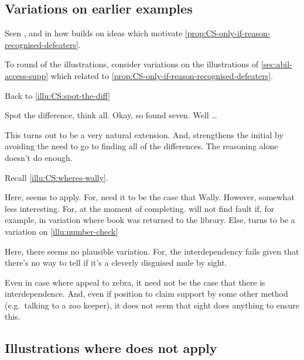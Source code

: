 \subsection{Variations on earlier examples}

\begin{note}
  Seen \nI{}, and in how builds on ideas which motivate \autoref{prop:CS-only-if-reason-recognised-defeaters}.

  To round of the illustrations, consider variations on the illustrations of \ref{sec:abil-access-supp} which related to \autoref{prop:CS-only-if-reason-recognised-defeaters}.
\end{note}

\begin{note}
  Back to \autoref{illu:CS:spot-the-diff}

  Spot the difference, think all.
  Okay, so found seven.
  Well \dots

  This turns out to be a very natural extension.
  And, strengthens the initial by avoiding the need to go to finding all of the differences.
  The reasoning alone doesn't do enough.
\end{note}

\begin{note}[Wally]
  Recall \autoref{illu:CS:wheres-wally}.

  Here, seems to apply.
  For, need it to be the case that Wally.
  However, somewhat less interesting.
  For, at the moment of completing.
  \nI{} will not find fault if, for example, in variation where book was returned to the library.
  Else, turns to be a variation on \autoref{illu:number-check}
\end{note}

\begin{note}
  Here, there seems no plausible variation.
  For, the interdependency fails given that there's no way to tell if it's a cleverly disguised mule by sight.

  Even in case where appeal to zebra, it need not be the case that there is interdependence.
  And, even if position to claim support by some other method (e.g.\ talking to a zoo keeper), it does not seem that sight does anything to ensure this.
\end{note}

\subsection{Illustrations where \nI{} does not apply}

